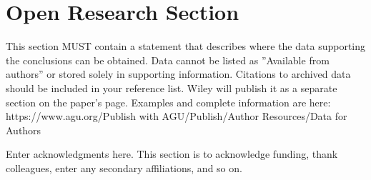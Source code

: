 \documentclass{agujournal2019}
\begin{document}




%
%

\section*{Open Research Section}
This section MUST contain a statement that describes where the data supporting the conclusions can be obtained. Data cannot be listed as ''Available from authors'' or stored solely in supporting information. Citations to archived data should be included in your reference list. Wiley will publish it as a separate section on the paper’s page. Examples and complete information are here:
https://www.agu.org/Publish with AGU/Publish/Author Resources/Data for Authors


\acknowledgments
Enter acknowledgments here. This section is to acknowledge funding, thank colleagues, enter any secondary affiliations, and so on.


%
%

%
\end{document}
